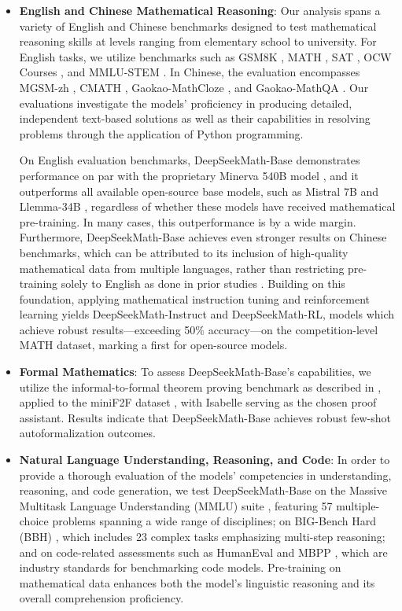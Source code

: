 \begin{itemize}[topsep=0pt]
    \item \textbf{English and Chinese Mathematical Reasoning}: Our analysis spans a variety of English and Chinese benchmarks designed to test mathematical reasoning skills at levels ranging from elementary school to university. For English tasks, we utilize benchmarks such as GSM8K \citep{gsm8k}, MATH \citep{MATH}, SAT \citep{llemma}, OCW Courses \citep{minerva}, and MMLU-STEM \citep{mmlu}. In Chinese, the evaluation encompasses MGSM-zh \citep{mgsm}, CMATH \citep{wei2023cmath}, Gaokao-MathCloze \citep{agieval}, and Gaokao-MathQA \citep{agieval}. Our evaluations investigate the models' proficiency in producing detailed, independent text-based solutions as well as their capabilities in resolving problems through the application of Python programming.

On English evaluation benchmarks, DeepSeekMath-Base demonstrates performance on par with the proprietary Minerva 540B model \citep{minerva}, and it outperforms all available open-source base models, such as Mistral 7B \citep{mistral} and Llemma-34B \citep{llemma}, regardless of whether these models have received mathematical pre-training. In many cases, this outperformance is by a wide margin. Furthermore, DeepSeekMath-Base achieves even stronger results on Chinese benchmarks, which can be attributed to its inclusion of high-quality mathematical data from multiple languages, rather than restricting pre-training solely to English as done in prior studies \citep{minerva,llemma}. Building on this foundation, applying mathematical instruction tuning and reinforcement learning yields DeepSeekMath-Instruct and DeepSeekMath-RL, models which achieve robust results—exceeding 50\% accuracy—on the competition-level MATH dataset, marking a first for open-source models.

\item \textbf{Formal Mathematics}: To assess DeepSeekMath-Base's capabilities, we utilize the informal-to-formal theorem proving benchmark as described in \citep{dsp_proof}, applied to the miniF2F dataset \citep{minif2f}, with Isabelle \citep{isabelle} serving as the chosen proof assistant. Results indicate that DeepSeekMath-Base achieves robust few-shot autoformalization outcomes.
\item \textbf{Natural Language Understanding, Reasoning, and Code}: In order to provide a thorough evaluation of the models' competencies in understanding, reasoning, and code generation, we test DeepSeekMath-Base on the Massive Multitask Language Understanding (MMLU) suite \citep{mmlu}, featuring 57 multiple-choice problems spanning a wide range of disciplines; on BIG-Bench Hard (BBH) \citep{bbh}, which includes 23 complex tasks emphasizing multi-step reasoning; and on code-related assessments such as HumanEval \citep{codex} and MBPP \citep{mbpp}, which are industry standards for benchmarking code models. Pre-training on mathematical data enhances both the model’s linguistic reasoning and its overall comprehension proficiency.


\end{itemize}
